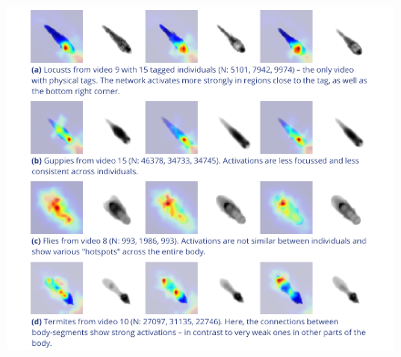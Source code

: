 \documentclass[9pt,lineno]{elife}
\newcommand{\videoref}[1]{video~\textit{\textbf{\ref{#1}}}}
\begin{document}
\begin{figure}[h]
\includegraphics[width=\textwidth]{figures/fig_activations.pdf}


\end{figure}
\end{document}
